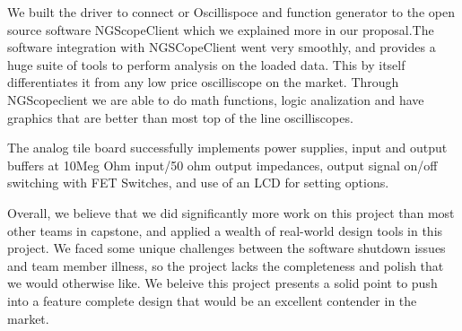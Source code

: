 We built the driver to connect or Oscillispoce and function generator to the open source software NGScopeClient which we explained more in our proposal.The software integration with NGSCopeClient went very smoothly, and provides a huge suite of tools to perform analysis on the loaded data. This by itself differentiates it from any low price oscilliscope on the market. Through NGScopeclient we are able to do math functions, logic analization and have graphics that are better than most top of the line oscilliscopes.

The analog tile board successfully implements power supplies, input and output buffers at 10Meg Ohm input/50 ohm output impedances, output signal on/off switching with FET Switches, and use of an LCD for setting options.

Overall, we believe that we did significantly more work on this project than most other teams in capstone, and applied a wealth of real-world design tools in this project. We faced some unique challenges between the software shutdown issues and team member illness, so the project lacks the completeness and polish that we would otherwise like. We beleive this project presents a solid point to push into a feature complete design that would be an excellent contender in the market.